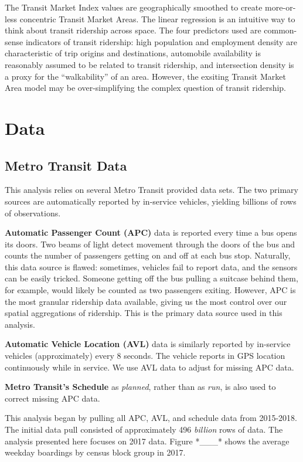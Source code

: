 \documentclass[
]{article}
\begin{document}
The Transit Market Index values are geographically smoothed to create
more-or-less concentric Transit Market Areas. The linear regression is
an intuitive way to think about transit ridership across space. The four
predictors used are common-sense indicators of transit ridership: high
population and employment density are characteristic of trip origins and
destinations, automobile availability is reasonably assumed to be
related to transit ridership, and intersection density is a proxy for
the ``walkability'' of an area. However, the exsiting Transit Market
Area model may be over-simplifying the complex question of transit
ridership.

\hypertarget{data}{%
\section{Data}\label{data}}

\hypertarget{metro-transit-data}{%
\subsection{Metro Transit Data}\label{metro-transit-data}}

This analysis relies on several Metro Transit provided data sets. The
two primary sources are automatically reported by in-service vehicles,
yielding billions of rows of observations.

\textbf{Automatic Passenger Count (APC)} data is reported every time a
bus opens its doors. Two beams of light detect movement through the
doors of the bus and counts the number of passengers getting on and off
at each bus stop. Naturally, this data source is flawed: sometimes,
vehicles fail to report data, and the sensors can be easily tricked.
Someone getting off the bus pulling a suitcase behind them, for example,
would likely be counted as two passengers exiting. However, APC is the
most granular ridership data available, giving us the most control over
our spatial aggregations of ridership. This is the primary data source
used in this analysis.

\textbf{Automatic Vehicle Location (AVL)} data is similarly reported by
in-service vehicles (approximately) every 8 seconds. The vehicle reports
in GPS location continuously while in service. We use AVL data to adjust
for missing APC data.

\textbf{Metro Transit's Schedule} as \emph{planned}, rather than as
\emph{run}, is also used to correct missing APC data.

This analysis began by pulling all APC, AVL, and schedule data from
2015-2018. The initial data pull consisted of approximately 496
\emph{billion} rows of data. The analysis presented here focuses on 2017
data. Figure *\_\_\_* shows the average weekday boardings by census
block group in 2017.
\end{document}

